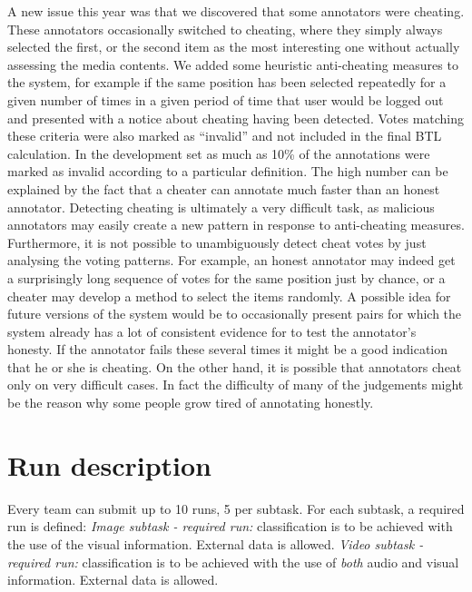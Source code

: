 \documentclass[sigconf]{acmart-me}
\begin{document}

A new issue this year was that we discovered that some annotators were cheating.
These annotators occasionally switched to cheating, where they simply always selected the first, or the second item as the most interesting one without actually assessing the media contents.
We added some heuristic anti-cheating measures to the system, for example if the same position has been selected repeatedly for a given number of times in a given period of time that user would be logged out and presented with a notice about cheating having been detected.
Votes matching these criteria were also marked as ``invalid'' and not included in the final BTL calculation.
In the development set as much as 10\% of the annotations were marked as invalid according to a particular definition.
The high number can be explained by the fact that a cheater can annotate much faster than an honest annotator.
Detecting cheating is ultimately a very difficult task, as malicious annotators may easily create a new pattern in response to anti-cheating measures.
Furthermore, it is not possible to unambiguously detect cheat votes by just analysing the voting patterns.  For example, an honest annotator may indeed get a surprisingly long sequence of votes for the same position just by chance, or a cheater may develop a method to select the items randomly.
A possible idea for future versions of the system would be to occasionally present pairs for which the system already has a lot of consistent evidence for to test the annotator's honesty.
If the annotator fails these several times it might be a good indication that he or she is cheating.
On the other hand, it is possible that annotators cheat only on very difficult cases.  In fact the difficulty of many of the judgements might be the reason why some people grow tired of annotating honestly.



\section{Run description}

Every team can submit up to 10 runs, 5 per subtask. For each subtask, a required run is defined: \emph{Image subtask - required run:} classification is to be achieved with the use of the visual information. External data is allowed. \emph{Video subtask - required run:} classification is to be achieved with the use of \emph{both} audio and visual information. External data is allowed.
\end{document}
